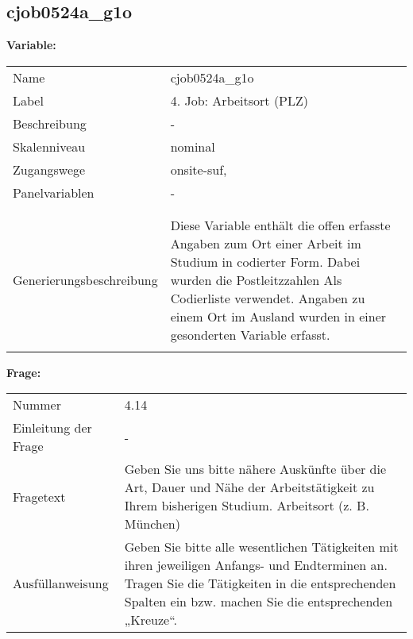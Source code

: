 	
	
	\subsection{cjob0524a\_g1o}
	\label{subSection:cjob0524a_g1o}

	\noindent\textbf{Variable:}\\
		\begin{tabular}{lL{11.3cm}}
			\label{tableVariable:cjob0524a_g1o}
			Name & cjob0524a\_g1o \\
			Label & 4. Job: Arbeitsort (PLZ) \\
			Beschreibung & - \\
			Skalenniveau & nominal \\
			Zugangswege &
				onsite-suf,
 \\
			Panelvariablen & -
			 \\
			 \\
 \\
					Generierungsbeschreibung & Diese Variable enthält die offen erfasste Angaben zum Ort einer Arbeit im Studium in codierter Form. Dabei wurden die Postleitzzahlen Als Codierliste verwendet. Angaben zu einem Ort im Ausland wurden in einer gesonderten Variable erfasst. 
				 \\	
			 \\
		\end{tabular}

		\vspace*{1 cm}
		\noindent\textbf{Frage:}\\
		\begin{tabular}{lL{11.3cm}}
			\label{tableQuestion:cjob0524a_g1o}
			Nummer & 4.14 \\
			Einleitung der Frage & - \\
			Fragetext & Geben Sie uns bitte nähere Auskünfte über die Art, Dauer und Nähe der Arbeitstätigkeit zu Ihrem bisherigen Studium.
Arbeitsort
(z. B. München) \\
			Ausfüllanweisung & Geben Sie bitte alle wesentlichen Tätigkeiten mit ihren jeweiligen Anfangs- und Endterminen an. Tragen Sie die Tätigkeiten in die entsprechenden Spalten ein bzw. machen Sie die entsprechenden „Kreuze“. \\
		\end{tabular}





